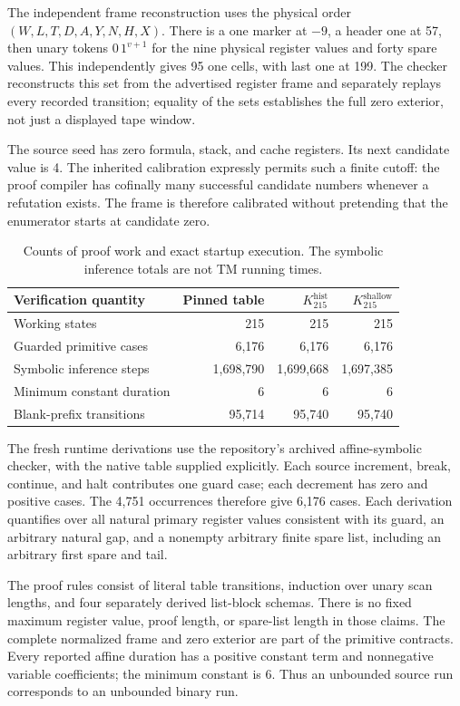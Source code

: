 \documentclass[11pt]{article}
\theoremstyle{definition}
\newcommand{\Kctx}{K_{215}^{\mathrm{hist}}}
\newcommand{\Ksh}{K_{215}^{\mathrm{shallow}}}
\begin{document}
The independent frame reconstruction uses the physical order
\((W,L,T,D,A,Y,N,H,X)\). There is a one marker at \(-9\), a header one at
57, then unary tokens \(0\,1^{v+1}\) for the nine physical register values
and forty spare values. This independently gives 95 one cells, with last
one at 199. The checker reconstructs this set from the advertised
register frame and separately replays every recorded transition; equality
of the sets establishes the full zero exterior, not just a displayed tape
window.

The source seed has zero formula, stack, and cache registers. Its next
candidate value is 4. The inherited calibration expressly permits such a
finite cutoff: the proof compiler has cofinally many successful candidate
numbers whenever a refutation exists. The frame is therefore calibrated
without pretending that the enumerator starts at candidate zero.

\begin{table}[ht]
\centering\small
\begin{tabular}{@{}lrrr@{}}
\toprule
Verification quantity & Pinned table & \(\Kctx\) & \(\Ksh\)\\
\midrule
Working states & 215 & 215 & 215\\
Guarded primitive cases & 6,176 & 6,176 & 6,176\\
Symbolic inference steps & 1,698,790 & 1,699,668 & 1,697,385\\
Minimum constant duration & 6 & 6 & 6\\
Blank-prefix transitions & 95,714 & 95,740 & 95,740\\
\bottomrule
\end{tabular}
\caption{Counts of proof work and exact startup execution. The symbolic
inference totals are not TM running times.}
\end{table}

The fresh runtime derivations use the repository's archived affine-symbolic
checker, with the native table supplied explicitly. Each source increment,
break, continue, and halt contributes one guard case; each decrement has
zero and positive cases. The 4,751 occurrences therefore give 6,176 cases.
Each derivation quantifies over all natural primary register values
consistent with its guard, an arbitrary natural gap, and a nonempty
arbitrary finite spare list, including an arbitrary first spare and tail.

The proof rules consist of literal table transitions, induction over unary
scan lengths, and four separately derived list-block schemas. There is no
fixed maximum register value, proof length, or spare-list length in those
claims. The complete normalized frame and zero exterior are part of the
primitive contracts. Every reported affine duration has a positive
constant term and nonnegative variable coefficients; the minimum constant
is 6. Thus an unbounded source run corresponds to an unbounded binary run.
\end{document}
